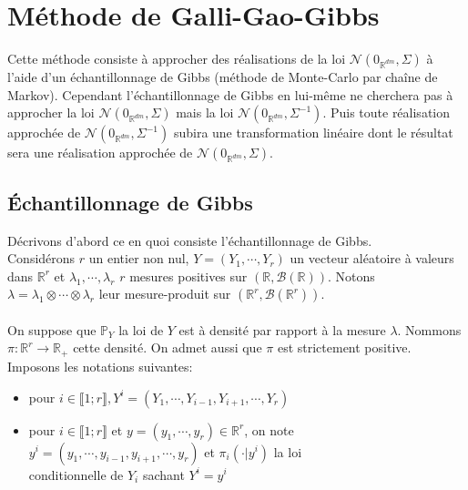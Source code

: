 \chapter{Méthode de Galli-Gao-Gibbs}
\label{GGGMethod}

Cette méthode consiste à approcher des réalisations de la loi  $\mathcal{N}(0_{\mathbb{R}^{dm}},\Sigma)$
à l'aide d'un échantillonnage de Gibbs (méthode de Monte-Carlo par chaîne de Markov). Cependant
l'échantillonnage de Gibbs en lui-même ne cherchera pas à approcher la loi
$\mathcal{N}(0_{\mathbb{R}^{dm}},\Sigma)$ mais la loi $\mathcal{N}(0_{\mathbb{R}^{dm}},\Sigma^{-1})$. Puis toute
réalisation approchée de $\mathcal{N}(0_{\mathbb{R}^{dm}},\Sigma^{-1})$ subira une transformation linéaire
dont le résultat sera une réalisation approchée de $\mathcal{N}(0_{\mathbb{R}^{dm}},\Sigma)$.

\section{\'Echantillonnage de Gibbs}
\label{debutChapGibbs}
\noindent Décrivons d'abord ce en quoi consiste l'échantillonnage de Gibbs.\\

Considérons $r$ un entier non nul, $Y = (Y_1, \cdots, Y_r)$ un vecteur aléatoire à valeurs dans $\mathbb{R}^r$ et 
$\lambda_1, \cdots, \lambda_r$ $r$  mesures positives sur $(\mathbb{R},\mathcal{B}(\mathbb{R}))$.
Notons $\lambda = \lambda_1 \otimes \cdots \otimes \lambda_r $ leur mesure-produit sur $(\mathbb{R}^r,\mathcal{B}(\mathbb{R}^r))$.\\
~\\
On suppose que $\mathbb{P}_{Y}$ la loi de $Y$ est à densité par rapport à la mesure $\lambda$. Nommons $\pi: \mathbb{R}^r \rightarrow \mathbb{R}_{+}$
cette densité. On admet aussi que $\pi$ est strictement positive.\\

\noindent Imposons les notations suivantes: 

\begin{itemize}
  \item pour $i \in \llbracket 1;r \rrbracket , Y^i = (Y_1, \cdots, Y_{i-1}, Y_{i+1}, \cdots, Y_{r})$
  \item pour $i \in \llbracket 1;r \rrbracket$ et $y = (y_1, \cdots, y_r) \in \mathbb{R}^{r}$, on note\\ $y^i = (y_1, \cdots, y_{i-1}, y_{i+1}, \cdots, y_{r})$ et $\pi_i(\cdot | y^i)$ la loi \\conditionnelle de $Y_i$ sachant $Y^i = y^i$
\end{itemize}

